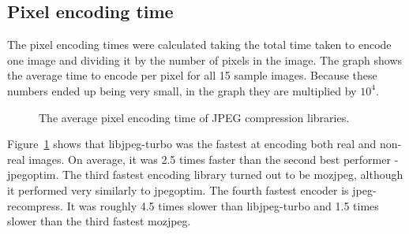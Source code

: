 \documentclass[12pt]{article}
\begin{document}
\subsection{Pixel encoding time}
The pixel encoding times were calculated taking the total time taken to encode one image and dividing it by the number of pixels in the image. The graph shows the average time to encode per pixel for all 15 sample images. Because these numbers ended up being very small, in the graph they are multiplied by $10^4$.
\begin{figure}[H]
	\caption{The average pixel encoding time of JPEG compression libraries.}
	\label{avgCompressionSpeeds}
\end{figure}
Figure~\ref{avgCompressionSpeeds} shows that libjpeg-turbo was the fastest at encoding both real and non-real images. On average, it was 2.5 times faster than the second best performer - jpegoptim. The third fastest encoding library turned out to be mozjpeg, although it performed very similarly to jpegoptim. The fourth fastest encoder is jpeg-recompress. It was roughly 4.5 times slower than libjpeg-turbo and 1.5 times slower than the third fastest mozjpeg.
\end{document}
